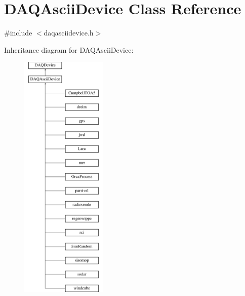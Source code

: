 \hypertarget{classDAQAsciiDevice}{\section{D\-A\-Q\-Ascii\-Device Class Reference}
\label{classDAQAsciiDevice}
}


{\ttfamily \#include $<$daqasciidevice.\-h$>$}

Inheritance diagram for D\-A\-Q\-Ascii\-Device\-:\begin{figure}[H]
\begin{center}
\leavevmode
\includegraphics[height=12.000000cm]{classDAQAsciiDevice}
\end{center}
\end{figure}
